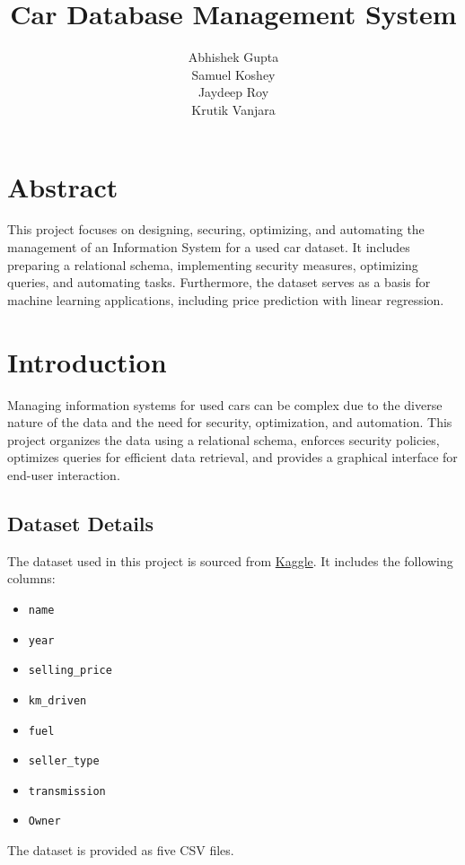 \documentclass[12pt]{report}
\title{Car Database Management System}
\author{
  Abhishek Gupta \\ 
  Samuel Koshey \\ 
  Jaydeep Roy \\ 
  Krutik Vanjara
}
\begin{document}
\maketitle
\tableofcontents
\newpage

\chapter*{Abstract}
This project focuses on designing, securing, optimizing, and automating the management of an Information System for a used car dataset. It includes preparing a relational schema, implementing security measures, optimizing queries, and automating tasks. Furthermore, the dataset serves as a basis for machine learning applications, including price prediction with linear regression.

\chapter{Introduction}
Managing information systems for used cars can be complex due to the diverse nature of the data and the need for security, optimization, and automation. This project organizes the data using a relational schema, enforces security policies, optimizes queries for efficient data retrieval, and provides a graphical interface for end-user interaction. 

\section{Dataset Details}
The dataset used in this project is sourced from \href{https://www.kaggle.com/datasets/nehalbirla/vehicle-dataset-from-cardekho?select=car+details+v4.csv}{Kaggle}. It includes the following columns:
\begin{itemize}
    \item \texttt{name}
    \item \texttt{year}
    \item \texttt{selling\_price}
    \item \texttt{km\_driven}
    \item \texttt{fuel}
    \item \texttt{seller\_type}
    \item \texttt{transmission}
    \item \texttt{Owner}
\end{itemize}

The dataset is provided as five CSV files.
\end{document}
